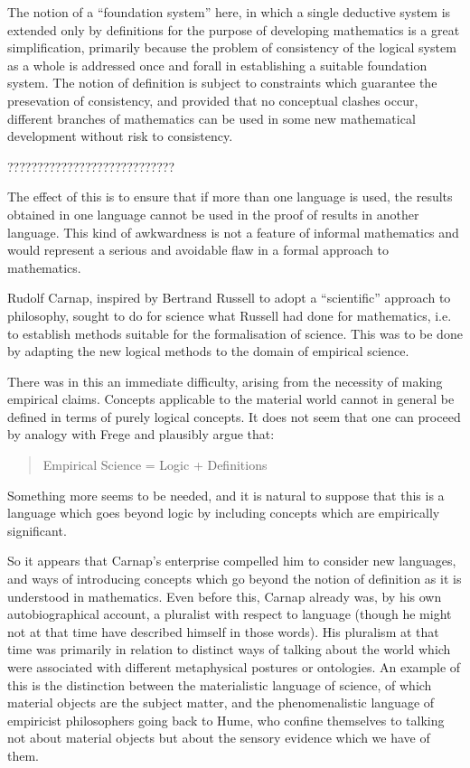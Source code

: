 The notion of a ``foundation system'' here, in which a single
deductive system is extended only by definitions for the purpose
of developing mathematics is a great simplification, primarily
because the problem of consistency of the logical system as a whole
is addressed once and forall in establishing a suitable foundation
system.
The notion of definition is subject to constraints which guarantee
the presevation of consistency, and provided that no conceptual
clashes occur, different branches of mathematics can be used in
some new mathematical development without risk to consistency.

????????????????????????????

The effect of this is to ensure that if more than one language is
used, the results obtained in one language cannot be used in the proof
of results in another language.
This kind of awkwardness is not a feature of informal mathematics and
would represent a serious and avoidable flaw in a formal approach to
mathematics.

Rudolf Carnap, inspired by Bertrand Russell to adopt a ``scientific''
approach to philosophy, sought to do for science what Russell had
done for mathematics, i.e. to establish methods suitable for the
formalisation of science.
This was to be done by adapting the new logical methods to the domain
of empirical science.

There was in this an immediate difficulty, arising from the necessity
of making empirical claims.
Concepts applicable to the material world cannot in general be defined
in terms of purely logical concepts.
It does not seem that one can proceed by analogy with Frege and
plausibly argue that:

\begin{quote}
Empirical Science = Logic + Definitions
\end{quote}

Something more seems to be needed, and it is natural to suppose that
this is a language which goes beyond logic by including concepts which
are empirically significant.

So it appears that Carnap's enterprise compelled him to consider
new languages, and ways of introducing concepts which go beyond
the notion of definition as it is understood in mathematics.
Even before this, Carnap already was, by his own autobiographical
account, a pluralist with respect to language (though he might not at
that time have described himself in those words).
His pluralism at that time was primarily in relation to distinct ways
of talking about the world which were associated with different
metaphysical postures or ontologies.
An example of this is the distinction between the materialistic language of science,
of which material objects are the subject matter,
and the phenomenalistic language of empiricist philosophers going back to Hume,
who confine themselves to talking not about material objects but about the sensory evidence
which we have of them.

